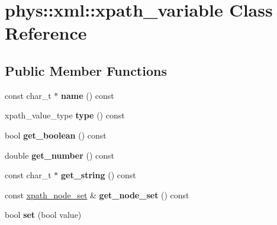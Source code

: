 \hypertarget{classphys_1_1xml_1_1xpath__variable}{
\section{phys::xml::xpath\_\-variable Class Reference}
\label{d8/d2c/classphys_1_1xml_1_1xpath__variable}
}
\subsection*{Public Member Functions}
\begin{DoxyCompactItemize}
\item 
\hypertarget{classphys_1_1xml_1_1xpath__variable_a8846df4f4e19d17625a609802160790f}{
const char\_\-t $\ast$ {\bfseries name} () const }
\label{d8/d2c/classphys_1_1xml_1_1xpath__variable_a8846df4f4e19d17625a609802160790f}

\item 
\hypertarget{classphys_1_1xml_1_1xpath__variable_a57edaea36e43573cf0928814fdceddbb}{
xpath\_\-value\_\-type {\bfseries type} () const }
\label{d8/d2c/classphys_1_1xml_1_1xpath__variable_a57edaea36e43573cf0928814fdceddbb}

\item 
\hypertarget{classphys_1_1xml_1_1xpath__variable_ac23a61d47aa2838c776ae876e06a8927}{
bool {\bfseries get\_\-boolean} () const }
\label{d8/d2c/classphys_1_1xml_1_1xpath__variable_ac23a61d47aa2838c776ae876e06a8927}

\item 
\hypertarget{classphys_1_1xml_1_1xpath__variable_a0972c04d65184f5ffbadc2a187313f1a}{
double {\bfseries get\_\-number} () const }
\label{d8/d2c/classphys_1_1xml_1_1xpath__variable_a0972c04d65184f5ffbadc2a187313f1a}

\item 
\hypertarget{classphys_1_1xml_1_1xpath__variable_ab0315cab85c5ed64aaf2b74b2e13e58c}{
const char\_\-t $\ast$ {\bfseries get\_\-string} () const }
\label{d8/d2c/classphys_1_1xml_1_1xpath__variable_ab0315cab85c5ed64aaf2b74b2e13e58c}

\item 
\hypertarget{classphys_1_1xml_1_1xpath__variable_ab47d5f0e1ee4348f7b9d63db393a594e}{
const \hyperlink{classphys_1_1xml_1_1xpath__node__set}{xpath\_\-node\_\-set} \& {\bfseries get\_\-node\_\-set} () const }
\label{d8/d2c/classphys_1_1xml_1_1xpath__variable_ab47d5f0e1ee4348f7b9d63db393a594e}

\item 
\hypertarget{classphys_1_1xml_1_1xpath__variable_a03fbb2a079668c654d665e5753c8fa94}{
bool {\bfseries set} (bool value)}
\label{d8/d2c/classphys_1_1xml_1_1xpath__variable_a03fbb2a079668c654d665e5753c8fa94}


\end{DoxyCompactItemize}
